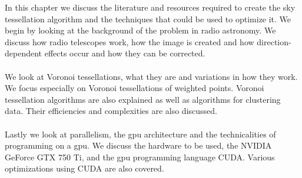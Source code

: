 In this chapter we discuss the literature and resources required to create the sky tessellation algorithm and the techniques that could be used to optimize it. We begin by looking at the background of the problem in radio astronomy. We discuss how radio telescopes work, how the image is created and how direction-dependent effects occur and how they can be corrected.
\\
\\
We look at Voronoi tessellations, what they are and variations in how they work. We focus especially on Voronoi tessellations of weighted points. Voronoi tessellation algorithms are also explained as well as algorithms for clustering data. Their efficiencies and complexities are also discussed.
\\
\\
Lastly we look at parallelism, the \gls{gpu} architecture and the technicalities of programming on a \gls{gpu}. We discuss the hardware to be used, the NVIDIA GeForce GTX 750 Ti, and the \gls{gpu} programming language CUDA. Various optimizations using CUDA are also covered.
